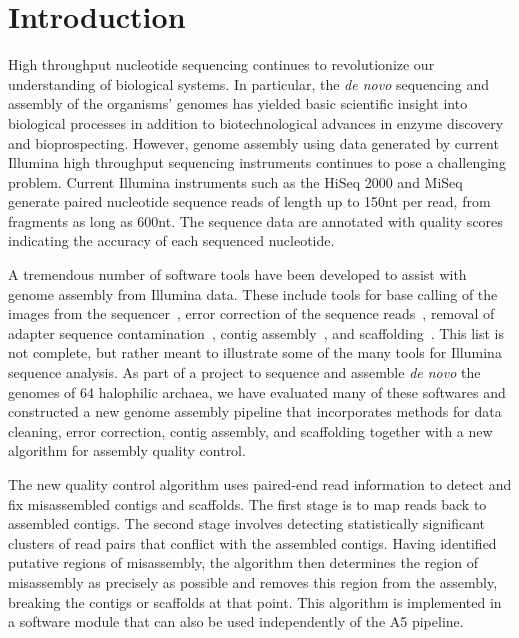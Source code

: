 \documentclass{bioinfo}
\begin{document}
\section{Introduction}
High throughput nucleotide sequencing continues to revolutionize our understanding of biological systems. In particular,
the \textit{de novo} sequencing and assembly of the organisms' genomes has yielded basic scientific insight into biological processes
in addition to biotechnological advances in enzyme discovery and bioprospecting.  However,
genome assembly using data generated by current Illumina high throughput sequencing instruments continues to pose a 
challenging problem. Current Illumina instruments such as the HiSeq 2000 and MiSeq generate paired nucleotide 
sequence reads of length up to 150nt per read, from fragments as long as 600nt. The sequence data are annotated with
quality scores indicating the accuracy of each sequenced nucleotide.

A tremendous number of software tools have been developed to assist with genome assembly from Illumina data.
These include tools for base calling of the images from the sequencer~\citep{Kao2009,Kircher2009},
error correction of the sequence reads~\citep{Kelley2010,Kao2011}, removal of adapter sequence contamination~\citep{Lassmann2009},
contig assembly~\citep{Warren2007,Chaisson2008}, and scaffolding~\citep{Koren2011,Boetzer2011,Dayarian2010}.
This list is not complete, but rather meant to illustrate some of the many tools for Illumina sequence analysis.
As part of a project to sequence and assemble \textit{de novo} the genomes of 64 halophilic archaea, we have
evaluated many of these softwares and constructed a new genome assembly pipeline that incorporates
methods for data cleaning, error correction, contig assembly, and scaffolding together with a new algorithm
for assembly quality control. 

The new quality control algorithm uses paired-end read information
to detect and fix misassembled contigs and scaffolds. The first stage is to map reads back to assembled contigs.
The second stage involves detecting statistically significant clusters of read pairs that conflict with the
assembled contigs. Having identified putative regions of misassembly, the algorithm then determines the 
region of misassembly as precisely as possible and removes this region from the assembly, breaking the contigs
or scaffolds at that point. This algorithm is implemented in a software module that can also be used 
independently of the A5 pipeline.
\end{document}
